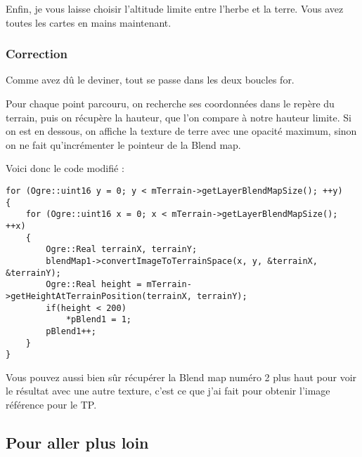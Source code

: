 Enfin, je vous laisse choisir l'altitude limite entre l'herbe et la terre. Vous avez toutes les cartes en mains maintenant.

























\subsubsection{Correction}

Comme avez d\^u le deviner, tout se passe dans les deux boucles for.

Pour chaque point parcouru, on recherche ses coordonn\'ees dans le rep\`ere du terrain, puis on r\'ecup\`ere la hauteur, que l'on compare \`a notre hauteur limite. Si on est en dessous, on affiche la texture de terre avec une opacit\'e maximum, sinon on ne fait qu'incr\'ementer le pointeur de la Blend map.

Voici donc le code modifi\'e :

\begin{lstlisting}[caption={Attribution de la transparence d\'esir\'ee sur tous les points du calque selon leur position}]
for (Ogre::uint16 y = 0; y < mTerrain->getLayerBlendMapSize(); ++y)
{
    for (Ogre::uint16 x = 0; x < mTerrain->getLayerBlendMapSize(); ++x)
    {
        Ogre::Real terrainX, terrainY;
        blendMap1->convertImageToTerrainSpace(x, y, &terrainX, &terrainY);
        Ogre::Real height = mTerrain->getHeightAtTerrainPosition(terrainX, terrainY);
        if(height < 200)
            *pBlend1 = 1;
        pBlend1++;
    }
}
\end{lstlisting}

Vous pouvez aussi bien s\^ur r\'ecup\'erer la Blend map num\'ero 2 plus haut pour voir le r\'esultat avec une autre texture, c'est ce que j'ai fait pour obtenir l'image r\'ef\'erence pour le TP.





\subsection{Pour aller plus loin}

